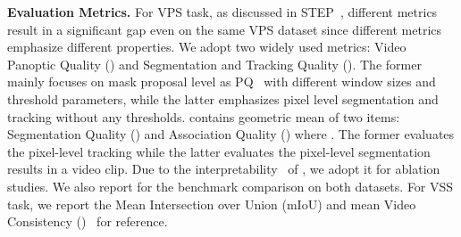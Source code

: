 \noindent
\textbf{Evaluation Metrics.} For VPS task, as discussed in STEP~\cite{STEP}, different metrics result in a significant gap even on the same VPS dataset since different metrics emphasize different properties. We adopt two widely used metrics: Video Panoptic Quality () and Segmentation and Tracking Quality (). The former mainly focuses on mask proposal level as PQ~\cite{kirillov2019panoptic} with different window sizes and threshold parameters, while the latter emphasizes pixel level segmentation and tracking without any thresholds.  contains geometric mean of two items: Segmentation Quality () and Association Quality () where . The former evaluates the pixel-level tracking while the latter evaluates the pixel-level segmentation results in a video clip. Due to the interpretability~\cite{STEP} of , we adopt it for ablation studies. We also report  for the benchmark comparison on both datasets. For VSS task, we report the Mean Intersection over Union (mIoU) and mean Video Consistency ()~\cite{miao2021vspw} for reference.
 

